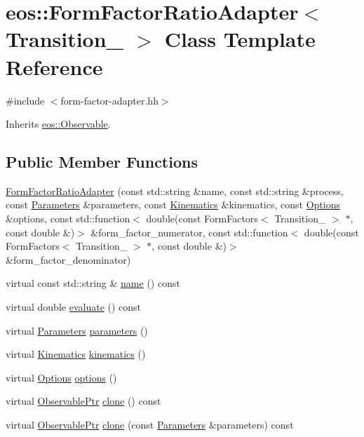 \hypertarget{classeos_1_1FormFactorRatioAdapter}{
\section{eos::FormFactorRatioAdapter$<$ Transition\_\- $>$ Class Template Reference}
\label{classeos_1_1FormFactorRatioAdapter}
}


{\ttfamily \#include $<$form-\/factor-\/adapter.hh$>$}

Inherits \hyperlink{classeos_1_1Observable}{eos::Observable}.\subsection*{Public Member Functions}
\begin{DoxyCompactItemize}
\item 
\hyperlink{classeos_1_1FormFactorRatioAdapter_aabe5ff6acb4c2411a9dcc17b0c8058db}{FormFactorRatioAdapter} (const std::string \&name, const std::string \&process, const \hyperlink{classeos_1_1Parameters}{Parameters} \&parameters, const \hyperlink{classeos_1_1Kinematics}{Kinematics} \&kinematics, const \hyperlink{classeos_1_1Options}{Options} \&options, const std::function$<$ double(const FormFactors$<$ Transition\_\- $>$ $\ast$, const double \&)$>$ \&form\_\-factor\_\-numerator, const std::function$<$ double(const FormFactors$<$ Transition\_\- $>$ $\ast$, const double \&)$>$ \&form\_\-factor\_\-denominator)
\item 
virtual const std::string \& \hyperlink{classeos_1_1FormFactorRatioAdapter_a4794ed40d561e939e566f328d16652fe}{name} () const 
\item 
virtual double \hyperlink{classeos_1_1FormFactorRatioAdapter_af0bed5942d9ba4b3c65788e1e05eaf8c}{evaluate} () const 
\item 
virtual \hyperlink{classeos_1_1Parameters}{Parameters} \hyperlink{classeos_1_1FormFactorRatioAdapter_a7146382f5bfc1c2b59119e844a6201a6}{parameters} ()
\item 
virtual \hyperlink{classeos_1_1Kinematics}{Kinematics} \hyperlink{classeos_1_1FormFactorRatioAdapter_a821bf6d21630dd75c8a25cd18f1cdd59}{kinematics} ()
\item 
virtual \hyperlink{classeos_1_1Options}{Options} \hyperlink{classeos_1_1FormFactorRatioAdapter_a4fe52226955dacc174be74224d8b627b}{options} ()
\item 
virtual \hyperlink{namespaceeos_a470e5dd806bd129080f1aa0c2954646f}{ObservablePtr} \hyperlink{classeos_1_1FormFactorRatioAdapter_ab5c4a8094db5ac8fc3860afc4a4087b0}{clone} () const 
\item 
virtual \hyperlink{namespaceeos_a470e5dd806bd129080f1aa0c2954646f}{ObservablePtr} \hyperlink{classeos_1_1FormFactorRatioAdapter_ad8de46a9cedc903bfe0beecbbf66dc58}{clone} (const \hyperlink{classeos_1_1Parameters}{Parameters} \&parameters) const 
\end{DoxyCompactItemize}
